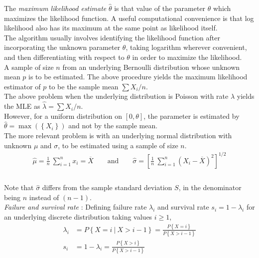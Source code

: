 The \textit{maximum likelihood estimate} $ \widehat{\theta} $ is that value of the parameter $ \theta $ which maximizes the likelihood function. A useful computational convenience is that log likelihood also has its maximum at the same point as likelihood itself. \\

The algorithm usually involves identifying the likelihood function after incorporating the unknown parameter $ \theta $, taking logarithm wherever convenient, and then differentiating with respect to $ \theta $ in order to maximize the likelihood. \\

A sample of size $ n $ from an underlying Bernoulli distribution whose unknown mean $ p $ is to be estimated. The above procedure yields the maximum likelihood estimator of $ p $ to be the sample mean $ \sum X_i / n$.\\

The above problem when the underlying distribution is Poisson with rate $ \lambda $ yields the MLE as $ \widehat{\lambda} =  \sum X_i / n$.\\

However, for a uniform distribution on $ [0, \theta] $, the parameter is estimated by $ \widehat{\theta} = \max(\left\{X_i\right\}) $ and not by the sample mean.\\

The more relevant problem is with an underlying normal distribution with unknown $ \mu $ and $ \sigma $, to be estimated using a sample of size $ n $. \\

\begin{align}
	\widehat{\mu} = \frac{1}{n}\ \sum\limits_{i=1}^{n} x_i = \overline{X} \qquad \text{and} \qquad \widehat{\sigma} = \left[\frac{1}{n}\  \sum\limits_{i=1}^{n} (X_i - \overline{X})^2 \right] ^{1/2} \\
\end{align} \\

Note that $ \widehat{\sigma} $ differs from the sample standard deviation $ S $, in the denominator being $ n $ instead of $ (n-1) $.\\

\textit{Failure and survival rate} : Defining failure rate $ \lambda_i $ and survival rate $ s_i = 1 - \lambda_i $ for an underlying discrete distribution taking values $ i \geq 1 $, \\

\begin{align}
	\lambda_i &= P \left\{X = i\ |\ X > i-1\right\} = \frac{P \left\{X = i\right\}}{P\left\{X > i-1\right\}} \\
	s_i &= 1 - \lambda_i = \frac{P \left\{X > i\right\}}{P\left\{X > i-1\right\}}
\end{align} \\

